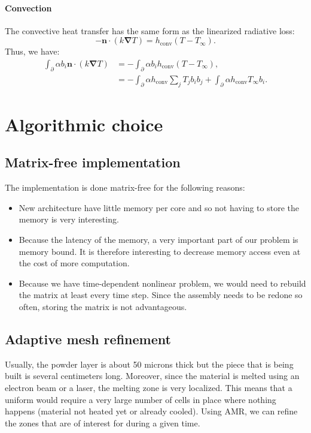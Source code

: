 \documentclass[letterpaper]{article}
\newcommand\bn{\boldsymbol{\nabla}}
\renewcommand{\(}{\left(}
\renewcommand{\)}{\right)}
\renewcommand{\[}{\left[}
\renewcommand{\]}{\right]}
\begin{document}
\paragraph{Convection}
The convective heat transfer has the same form as the linearized radiative loss:
\begin{equation}
  -\boldsymbol{n} \cdot \(k\bn T\) = h_{\text{conv}}\(T-T_{\infty}\).
\end{equation}
Thus, we have:
\begin{equation}
  \begin{split}
    \int_{\partial} \alpha b_i \boldsymbol{n} \cdot \(k \bn T\) &= 
    -\int_{\partial} \alpha b_i h_{\text{conv}} \(T-T_{\infty}\),\\
    &=-\int_{\partial} \alpha h_{\text{conv}} \sum_j T_j b_i b_j +
    \int_{\partial} \alpha h_{\text{conv}} T_{\infty} b_i.
  \end{split}
\end{equation}



\section{Algorithmic choice}
\subsection{Matrix-free implementation}
The implementation is done matrix-free for the following reasons:
\begin{itemize}
  \item New architecture have little memory per core and so not having to store
    the memory is very interesting.
  \item Because the latency of the memory, a very important part of our problem
    is memory bound. It is therefore interesting to decrease memory access even
    at the cost of more computation.
  \item Because we have time-dependent nonlinear problem, we would need to
    rebuild the matrix at least every time step. Since the assembly needs to be
    redone so often, storing the matrix is not advantageous.
\end{itemize}

\subsection{Adaptive mesh refinement}
Usually, the powder layer is about 50 microns thick but the piece that is being
built is several centimeters long. Moreover, since the material is melted using
an electron beam or a laser, the melting zone is very localized. This means that
a uniform would require a very large number of cells in place where nothing
happens (material not heated yet or already cooled). Using AMR, we can refine
the zones that are of interest for during a given time.
\end{document}

